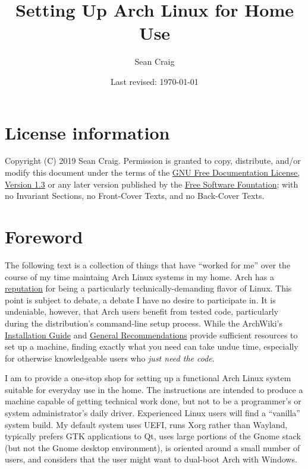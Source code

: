 \documentclass[letterpaper,12pt]{article}
\title{Setting Up Arch Linux for Home Use}
\author{Sean Craig}
\date{Last revised: \today}
\newcommand{\p}{\par\bigskip}
\begin{document}
\maketitle
\tableofcontents

\section{License information}
Copyright (C) 2019 Sean Craig.
Permission is granted to copy, distribute, and/or modify this document under the terms of the \href{https://www.gnu.org/copyleft/fdl.html}{GNU Free Documentation License, Version 1.3} or any later version published by the \href{https://www.fsf.org/}{Free Software Fountation}; with no Invariant Sections, no Front-Cover Texts, and no Back-Cover Texts.

\section{Foreword}
The following text is a collection of things that have ``worked for me'' over the course of my time maintaing Arch Linux systems in my home. Arch has a \href{https://www.linuxinsider.com/story/85666.html}{reputation} for being a particularly technically-demanding flavor of Linux. This point is subject to debate, a debate I have no desire to participate in. It is undeniable, however, that Arch users benefit from tested code, particularly during the distribution's command-line setup process. While the ArchWiki's \href{https://wiki.archlinux.org/index.php/Installation_guide}{Installation Guide} and \href{https://wiki.archlinux.org/index.php/General_recommendations}{General Recommendations} provide sufficient resources to set up a machine, finding exactly what you need can take undue time, especially for otherwise knowledgeable users who {\em just need the code}. \p

I am to provide a one-stop shop for setting up a functional Arch Linux system suitable for everyday use in the home. The instructions are intended to produce a machine capable of getting technical work done, but not to be a programmer's or system administrator's daily driver. Experienced Linux users will find a ``vanilla'' system build. My default system uses UEFI, runs Xorg rather than Wayland, typically prefers GTK applications to Qt, uses large portions of the Gnome stack (but not the Gnome desktop environment), is oriented around a small number of users, and considers that the user might want to dual-boot Arch with Windows. \p
\end{document}
